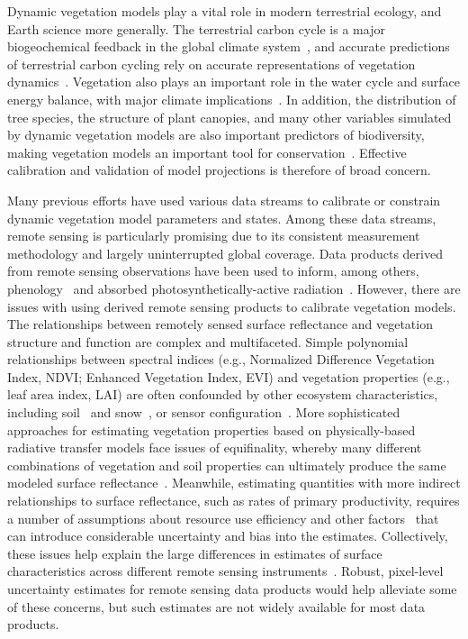 \introduction  %

Dynamic vegetation models play a vital role in modern terrestrial ecology, and Earth science more generally.
The terrestrial carbon cycle is a major biogeochemical feedback in the global climate system~\citep{heinze_2019_esd_reviews}, and accurate predictions of terrestrial carbon cycling rely on accurate representations of vegetation dynamics~\citep{pacala_1995_details_that_matter}.
Vegetation also plays an important role in the water cycle and surface energy balance, with major climate implications~\citep{bonan2008forests}.
In addition, the distribution of tree species, the structure of plant canopies, and many other variables simulated by dynamic vegetation models are also important predictors of biodiversity, making vegetation models an important tool for conservation~\citep{mcmahon2011improving}.
Effective calibration and validation of model projections is therefore of broad concern.

Many previous efforts have used various data streams to calibrate or constrain dynamic vegetation model parameters and states.
Among these data streams, remote sensing is particularly promising due to its consistent measurement methodology and largely uninterrupted global coverage.
Data products derived from remote sensing observations have been used to inform, among others,
phenology~\citep{knorr2010carbon, viskari2015modeldata}
and absorbed photosynthetically-active radiation~\citep{peylin2016new, schurmann2016constraining, zobitz_2014_joint}.
However, there are issues with using derived remote sensing products to calibrate vegetation models.
The relationships between remotely sensed surface reflectance and vegetation structure and function are complex and multifaceted.
Simple polynomial relationships between spectral indices (e.g., Normalized Difference Vegetation Index, NDVI; Enhanced Vegetation Index, EVI) and vegetation properties (e.g., leaf area index, LAI) are often confounded by other ecosystem characteristics, including soil~\citep{myneni1994relationship} and snow~\citep{zhang2020evaluating}, or sensor configuration~\citep{fensholt2004evaluation}.
More sophisticated approaches for estimating vegetation properties based on physically-based radiative transfer models face issues of equifinality, whereby many different combinations of vegetation and soil properties can ultimately produce the same modeled surface reflectance~\citep{combal2003retrieval, lewis2007spectral}.
Meanwhile, estimating quantities with more indirect relationships to surface reflectance, such as rates of primary productivity, requires a number of assumptions about resource use efficiency and other factors~\citep{running2004continuous} that can introduce considerable uncertainty and bias into the estimates.
Collectively, these issues help explain the large differences in estimates of surface characteristics across different remote sensing instruments~\citep{liu_2018_satellite}.
Robust, pixel-level uncertainty estimates for remote sensing data products would help alleviate some of these concerns, but such estimates are not widely available for most data products.

